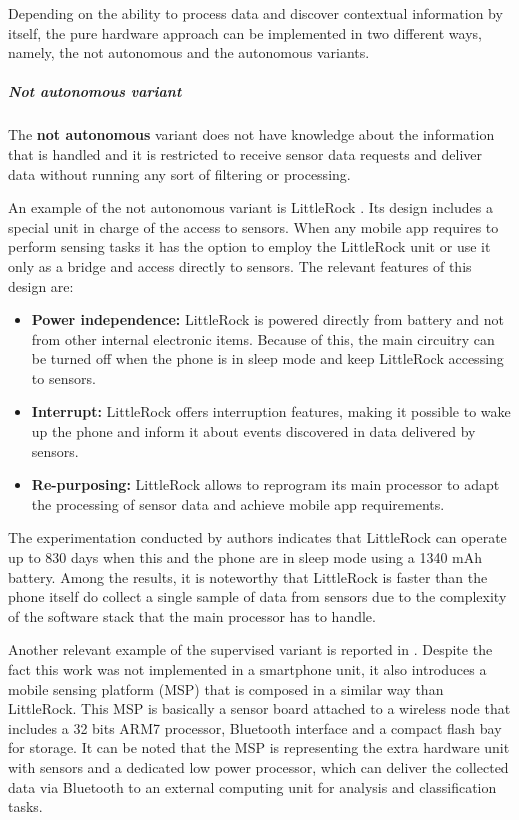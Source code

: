 Depending on the ability to process data and discover contextual information by itself, the pure hardware approach can be implemented in two different ways, namely, the not autonomous and the autonomous variants.

\subparagraph{Not autonomous variant}
\label{subp:not_autonomous_variant}

The \textbf{not autonomous} variant does not have knowledge about the information that is handled and it is restricted to receive sensor data requests and deliver data without running any sort of filtering or processing.

An example of the not autonomous variant is LittleRock \cite{Priyantha2011}.
Its design includes a special unit in charge of the access to sensors.
When any mobile app requires to perform sensing tasks it has the option to employ the LittleRock unit or use it only as a bridge and access directly to sensors.
The relevant features of this design are:

\begin{itemize}
  \item \textbf{Power independence:} LittleRock is powered directly from battery and not from other internal electronic items.
  Because of this, the main circuitry can be turned off when the phone is in sleep mode and keep LittleRock accessing to sensors.
  
  \item \textbf{Interrupt:} LittleRock offers interruption features, making it possible to wake up the phone and inform it about events discovered in data delivered by sensors.
  
  \item \textbf{Re-purposing:} LittleRock allows to reprogram its main processor to adapt the processing of sensor data and achieve mobile app requirements.
\end{itemize}

The experimentation conducted by authors indicates that LittleRock can operate up to 830 days when this and the phone are in sleep mode using a 1340 mAh battery.
Among the results, it is noteworthy that LittleRock is faster than the phone itself do collect a single sample of data from sensors due to the complexity of the software stack that the main processor has to handle.

Another relevant example of the supervised variant is reported in \cite{Choudhury2008}.
Despite the fact this work was not implemented in a smartphone unit, it also introduces a mobile sensing platform (MSP) that is composed in a similar way than LittleRock.
This MSP is basically a sensor board attached to a wireless node that includes a 32 bits ARM7 processor, Bluetooth interface and a compact flash bay for storage.
It can be noted that the MSP is representing the extra hardware unit with sensors and a dedicated low power processor, which can deliver the collected data via Bluetooth to an external computing unit for analysis and classification tasks.


